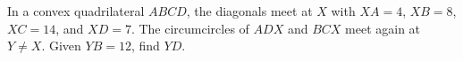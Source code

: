 In a convex quadrilateral $ABCD$, the diagonals meet at $X$ with $XA=4$, $XB=8$, $XC=14$, and $XD=7$. The circumcircles of $ADX$ and $BCX$ meet again at $Y\ne X$. Given $YB=12$, find $YD$.
